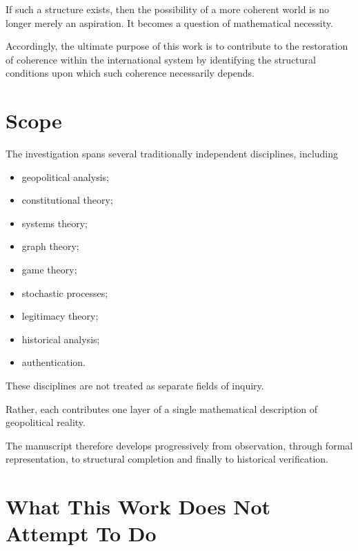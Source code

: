 \documentclass[11pt,openany]{book}
\theoremstyle{plain}
\theoremstyle{definition}
\begin{document}
If such a structure exists, then the possibility of a more coherent world is no longer merely an aspiration. It becomes a question of mathematical necessity.

Accordingly, the ultimate purpose of this work is to contribute to the restoration of coherence within the international system by identifying the structural conditions upon which such coherence necessarily depends.


\section*{Scope}

The investigation spans several traditionally independent disciplines, including

\begin{itemize}

\item geopolitical analysis;

\item constitutional theory;

\item systems theory;

\item graph theory;

\item game theory;

\item stochastic processes;

\item legitimacy theory;

\item historical analysis;

\item authentication.

\end{itemize}

These disciplines are not treated as separate fields of inquiry.

Rather, each contributes one layer of a single mathematical description of geopolitical reality.

The manuscript therefore develops progressively from observation, through formal representation, to structural completion and finally to historical verification.


\section*{What This Work Does Not Attempt To Do}
\end{document}
